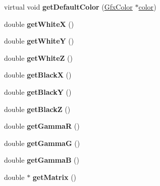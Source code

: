 \begin{DoxyCompactItemize}
\mbox{\label{class_gfx_cal_r_g_b_color_space_a0740d87197e68c8d3aaf038d51bce6bd}} 
virtual void {\bfseries get\+Default\+Color} (\hyperlink{struct_gfx_color}{Gfx\+Color} $\ast$\hyperlink{structcolor}{color})
\item 
\mbox{\label{class_gfx_cal_r_g_b_color_space_a0946d527add8a8aabed1fa351e55238f}} 
double {\bfseries get\+WhiteX} ()
\item 
\mbox{\label{class_gfx_cal_r_g_b_color_space_a163968c1f4fe050c1f5170f5edc21efc}} 
double {\bfseries get\+WhiteY} ()
\item 
\mbox{\label{class_gfx_cal_r_g_b_color_space_a322d679c177f1856a512458d4ff0d775}} 
double {\bfseries get\+WhiteZ} ()
\item 
\mbox{\label{class_gfx_cal_r_g_b_color_space_ad174acd3bd9b9ca4b7c341940edde768}} 
double {\bfseries get\+BlackX} ()
\item 
\mbox{\label{class_gfx_cal_r_g_b_color_space_a5967ad696b0fa694ebb2b34274f82dec}} 
double {\bfseries get\+BlackY} ()
\item 
\mbox{\label{class_gfx_cal_r_g_b_color_space_af4f933d8c987d281be122195fa77b31e}} 
double {\bfseries get\+BlackZ} ()
\item 
\mbox{\label{class_gfx_cal_r_g_b_color_space_a598829ab684f1f15ce4f4d47b6325599}} 
double {\bfseries get\+GammaR} ()
\item 
\mbox{\label{class_gfx_cal_r_g_b_color_space_af1ef90c6aec5ef8edb0b91f69a52eb7f}} 
double {\bfseries get\+GammaG} ()
\item 
\mbox{\label{class_gfx_cal_r_g_b_color_space_a59e31a8ca294b63c3e57066136b76619}} 
double {\bfseries get\+GammaB} ()
\item 
\mbox{\label{class_gfx_cal_r_g_b_color_space_a8b311cdc5f3cd9b9d29d96b1dab148f0}} 
double $\ast$ {\bfseries get\+Matrix} ()
\end{DoxyCompactItemize}
